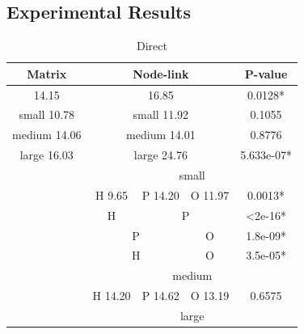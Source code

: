 \documentclass{l4proj}
\begin{document}
\subsection{Experimental Results}
\begin{table}[]
\centering
\caption{Direct}
\label{my-label}
\begin{tabular}{|c|c|c|c|c|c|c|}
\hline
\multicolumn{3}{|c|}{\textbf{Matrix}}     & \multicolumn{3}{c|}{\textbf{Node-link}} & \textbf{P-value}              \\ \hline
\multicolumn{3}{|c|}{14.15}               & \multicolumn{3}{c|}{16.85}              & 0.0128*                       \\ \hline
\multicolumn{3}{|c|}{small 10.78}         & \multicolumn{3}{c|}{small 11.92}        & 0.1055                        \\ \hline
\multicolumn{3}{|c|}{medium 14.06}        & \multicolumn{3}{c|}{medium 14.01}       & 0.8776                        \\ \hline
\multicolumn{3}{|c|}{large 16.03}         & \multicolumn{3}{c|}{large 24.76}        & 5.633e-07*                    \\ \hline
\multicolumn{3}{|c|}{\multirow{12}{*}{}}  & \multicolumn{4}{c|}{small}                                              \\ \cline{4-7} 
\multicolumn{3}{|c|}{}                    & H 9.65      & P 14.20     & O 11.97     & 0.0013*                       \\ \cline{4-7} 
\multicolumn{3}{|c|}{}                    & H           & \multicolumn{2}{c|}{P}    & \textless2e-16*               \\ \cline{4-7} 
\multicolumn{3}{|c|}{}                    & \multicolumn{2}{c|}{P}    & O           & 1.8e-09*                      \\ \cline{4-7} 
\multicolumn{3}{|c|}{}                    & \multicolumn{2}{c|}{H}    & O           & 3.5e-05*                      \\ \cline{4-7} 
\multicolumn{3}{|c|}{}                    & \multicolumn{4}{c|}{medium}                                             \\ \cline{4-7} 
\multicolumn{3}{|c|}{}                    & H 14.20     & P 14.62     & O 13.19     & 0.6575                        \\ \cline{4-7} 
\multicolumn{3}{|c|}{}                    & \multicolumn{4}{c|}{large}                                              \\ \cline{4-7} 

\end{tabular}
\end{table}
\end{document}
